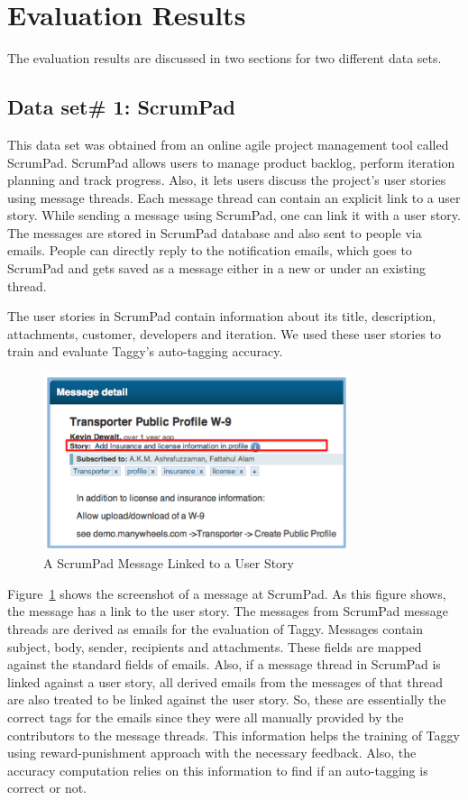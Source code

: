 \section{Evaluation Results}
The evaluation results are discussed in two sections for two different data sets.

\subsection{Data set\# 1: ScrumPad}	
This data set was obtained from an online agile project management tool called ScrumPad.	ScrumPad allows users to manage product backlog, perform iteration planning and track progress. Also, it lets users discuss the project's user stories using message threads. Each message thread can contain an explicit link to a user story. While sending a message using ScrumPad, one can link it with a user story. The messages are stored in ScrumPad database and also sent to people via emails. People can directly reply to the notification emails, which goes to ScrumPad and gets saved as a message either in a new or under an existing thread.

The user stories in ScrumPad contain information about its title, description, attachments, customer, developers and iteration. We used these user stories to train and evaluate Taggy's auto-tagging accuracy.

\begin{figure}[h!]
	\centering
	\includegraphics[width=0.8\textwidth]{scrumpad_message.png}
   \caption{A ScrumPad Message Linked to a User Story}
	\label{fig:scrumpad_message}
\end{figure}

Figure~\ref{fig:scrumpad_message} shows the screenshot of a message at ScrumPad. As this figure shows, the message has a link to the user story. The messages from ScrumPad message threads are derived as emails for the evaluation of Taggy. Messages contain subject, body, sender, recipients and attachments. These fields are mapped against the standard fields of emails. Also, if a message thread in ScrumPad is linked against a user story, all derived emails from the messages of that thread are also treated to be linked against the user story. So, these are essentially the correct tags for the emails since they were all manually provided by the contributors to the message threads. This information helps the training of Taggy using reward-punishment approach with the necessary feedback. Also, the accuracy computation relies on this information to find if an auto-tagging is correct or not.

